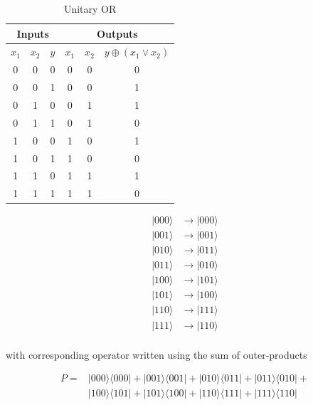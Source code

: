 \documentclass[main.tex]{subfiles}
\begin{document}
\begin{enumerate}
    \begin{table}
        \centering
        \begin{tabular}{ |c|c|c|c|c|c| } 
         \hline
         \multicolumn{3}{|c|}{Inputs} & \multicolumn{3}{c|}{Outputs} \\ 
         \hline
         $x_1$ & $x_2$ & $y$ & $x_1$ & $x_2$ & $y\oplus\left(x_{1}\vee x_{2}\right)$ \\ 
         \hline
         0 & 0 & 0 & 0 & 0 & 0\\ 
         \hline
         0 & 0 & 1 & 0 & 0 & 1\\ 
         \hline
         0 & 1 & 0 & 0 & 1 & 1\\ 
         \hline
         0 & 1 & 1 & 0 & 1 & 0\\ 
         \hline
         1 & 0 & 0 & 1 & 0 & 1\\ 
         \hline
         1 & 0 & 1 & 1 & 0 & 0\\ 
         \hline
         1 & 1 & 0 & 1 & 1 & 1\\ 
         \hline
         1 & 1 & 1 & 1 & 1 & 0\\ 
         \hline
        \end{tabular}
        \caption{Unitary OR}
        \label{tab:UnitaryOR}
    \end{table}

    \begin{align*}
        |000\rangle & \rightarrow|000\rangle\\
        |001\rangle & \rightarrow|001\rangle\\
        |010\rangle & \rightarrow|011\rangle\\
        |011\rangle & \rightarrow|010\rangle\\
        |100\rangle & \rightarrow|101\rangle\\
        |101\rangle & \rightarrow|100\rangle\\
        |110\rangle & \rightarrow|111\rangle\\
        |111\rangle & \rightarrow|110\rangle\\
    \end{align*}

    with corresponding operator written using the sum of outer-products
    
    \begin{align*}
        P = &|000\rangle\langle 000|+| 001\rangle\langle 001|+| 010\rangle\langle 011|+| 011\rangle\langle 010|+\\ 
            & |100\rangle\langle 101|+| 101\rangle\langle 100|+| 110\rangle\langle 111|+| 111\rangle\langle 110|
    \end{align*}


\end{enumerate}
\end{document}
